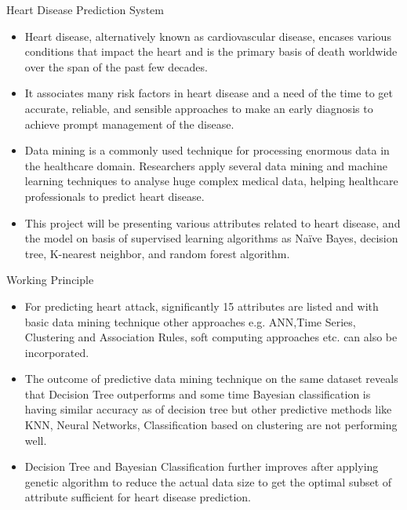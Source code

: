 \documentclass{SKP-beamer}
\begin{document}
\begin{frame}{Heart Disease Prediction System}
	\begin{itemize}
		\item Heart disease, alternatively known as cardiovascular disease, encases various conditions that impact the heart and is the primary basis of death worldwide over the span of the past few decades.
		\item  It associates many risk factors in heart disease and a need of the time to get accurate, reliable, and sensible approaches to make an early diagnosis to achieve prompt management of the disease. 
		\item Data mining is a commonly used technique for processing enormous data in the healthcare domain. Researchers apply several data mining and machine learning techniques to analyse huge complex medical data, helping healthcare professionals to predict heart disease. 
		\item This project will be presenting various attributes related to heart disease, and the model on basis of supervised learning algorithms as Naïve Bayes, decision tree, K-nearest neighbor, and random forest algorithm.
	\end{itemize}
\end{frame}

\begin{frame}{Working Principle}
	\begin{itemize}
		\item For predicting heart attack, significantly 15 attributes are listed
		and with basic data mining technique other approaches e.g. ANN,Time Series, Clustering and Association Rules, soft computing approaches etc. can also be incorporated. 
		\item The outcome of predictive data mining technique on the same dataset reveals that
		Decision Tree outperforms and some time Bayesian classification is having similar accuracy as of decision tree but other predictive methods like KNN, Neural Networks, Classification based on clustering are not performing well.
		\item Decision Tree and Bayesian Classification further improves after applying genetic algorithm to reduce the actual data size to get the optimal subset of attribute sufficient for heart disease prediction.
	\end{itemize}
\end{frame}
\end{document}
